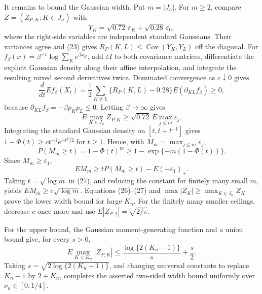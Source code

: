 It remains to bound the Gaussian width.  Put \(m=|J_n|\).  For \(m\geq2\), compare \(Z=(Z_{P,K}:K\in J_n)\) with
\[
 Y_K=\sqrt{0.72}\,\varepsilon_K+\sqrt{0.28}\,\varepsilon_0,
\]
where the right-side variables are independent standard Gaussians.  Their variances agree and (23) gives \(R_P(K,L)\leq\operatorname{Cov}(Y_K,Y_L)\) off the diagonal.  For
\(f_\beta(x)=\beta^{-1}\log\sum_Ke^{\beta x_K}\), add \(\varepsilon I\) to both covariance matrices, differentiate the explicit Gaussian density along their affine interpolation, and integrate the resulting mixed second derivatives twice.  Dominated convergence as \(\varepsilon\downarrow0\) gives
\[
 \frac d{dt}E f_\beta(X_t)
 =\frac12\sum_{K\neq L}\{R_P(K,L)-0.28\}E(\partial_{KL}f_\beta)\geq0,          \tag{25}
\]
because \(\partial_{KL}f_\beta=-\beta p_Kp_L\leq0\).  Letting \(\beta\to\infty\) gives
\[
 E\max_{K\in J_n}Z_{P,K}\geq\sqrt{0.72}\,E\max_{j\leq m}\varepsilon_j.       \tag{26}
\]
Integrating the standard Gaussian density on \([t,t+t^{-1}]\) gives \(1-\Phi(t)\geq ct^{-1}e^{-t^2/2}\) for \(t\geq1\).  Hence, with \(M_m=\max_{j\leq m}\varepsilon_j\),
\[
 P(M_m\geq t)=1-\Phi(t)^m\geq1-\exp\{-m(1-\Phi(t))\}.                          \tag{27}
\]
Since \(M_m\geq\varepsilon_1\),
\[
 EM_m\geq tP(M_m\geq t)-E(-\varepsilon_1)_+.
\]
Taking \(t=\sqrt{\log m}\) in (27), and reducing the constant for finitely many small \(m\), yields \(EM_m\geq c\sqrt{\log m}\).  Equations (26)--(27) and \(\max|Z_K|\geq\max_{K\in J_n}Z_K\) prove the lower width bound for large \(K_n\).  For the finitely many smaller ceilings, decrease \(c\) once more and use \(E|Z_{P,1}|=\sqrt{2/\pi}\).

For the upper bound, the Gaussian moment-generating function and a union bound give, for every \(s>0\),
\[
 E\max_{K<K_n}|Z_{P,K}|\leq\frac{\log\{2(K_n-1)\}}s+\frac s2.                  \tag{28}
\]
Taking \(s=\sqrt{2\log\{2(K_n-1)\}}\), and changing universal constants to replace \(K_n-1\) by \(2+K_n\), completes the asserted two-sided width bound uniformly over \(\nu_n\in[0,1/4]\).